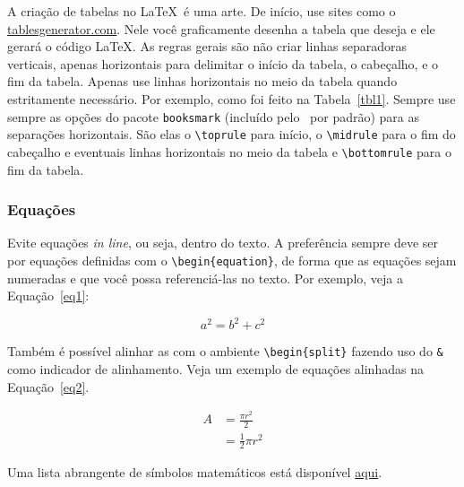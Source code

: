 A criação de tabelas no \LaTeX\ é uma arte. De início, use sites como o \href{https://www.tablesgenerator.com/}{tablesgenerator.com}. Nele você graficamente desenha a tabela que deseja e ele gerará o código \LaTeX. As regras gerais são não criar linhas separadoras verticais, apenas horizontais para delimitar o início da tabela, o cabeçalho, e o fim da tabela. Apenas use linhas horizontais no meio da tabela quando estritamente necessário. Por exemplo, como foi feito na Tabela~\ref{tbl1}. Sempre use sempre as opções do pacote \verb|booksmark| (incluído pelo \abnTeX\ por padrão) para as separações horizontais. São elas o \verb|\toprule| para início, o \verb|\midrule| para o fim do cabeçalho e eventuais linhas horizontais no meio da tabela e \verb|\bottomrule| para o fim da tabela.

\subsubsection{Equações}

Evite equações \textit{in line}, ou seja, dentro do texto. A preferência sempre deve ser por equações definidas com o \verb|\begin{equation}|, de forma que as equações sejam numeradas e que você possa referenciá-las no texto. Por exemplo, veja a Equação~\ref{eq1}:

\begin{equation} \label{eq1}
	a^2 = b^2 + c^2
\end{equation}

Também é possível alinhar as com o ambiente \verb|\begin{split}| fazendo uso do \verb|&| como indicador de alinhamento. Veja um exemplo de equações alinhadas na Equação~\ref{eq2}.

\begin{equation} \label{eq2}
	\begin{split}
	A & = \frac{\pi r^2}{2} \\
	 & = \frac{1}{2} \pi r^2
	\end{split}
\end{equation}

Uma lista abrangente de símbolos matemáticos está disponível \href{https://oeis.org/wiki/List_of_LaTeX_mathematical_symbols}{aqui}.
